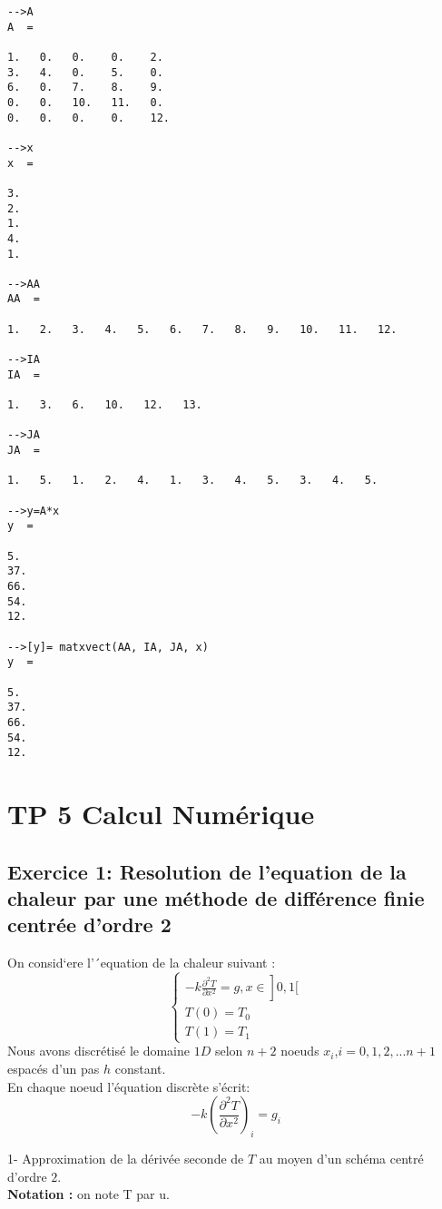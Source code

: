 \documentclass[12pt]{report}
\begin{document}
\begin{lstlisting}
-->A
A  = 

1.   0.   0.    0.    2. 
3.   4.   0.    5.    0. 
6.   0.   7.    8.    9. 
0.   0.   10.   11.   0. 
0.   0.   0.    0.    12.

-->x
x  = 

3.
2.
1.
4.
1.

-->AA
AA  = 

1.   2.   3.   4.   5.   6.   7.   8.   9.   10.   11.   12.

-->IA
IA  = 

1.   3.   6.   10.   12.   13.

-->JA
JA  = 

1.   5.   1.   2.   4.   1.   3.   4.   5.   3.   4.   5.

-->y=A*x
y  = 

5. 
37.
66.
54.
12.

-->[y]= matxvect(AA, IA, JA, x)
y  = 

5. 
37.
66.
54.
12.

\end{lstlisting}


\chapter{TP 5 Calcul Numérique}

\section{Exercice 1: Resolution de l’equation de la chaleur par une méthode de différence finie centrée d’ordre 2}
On consid`ere l’´equation de la chaleur suivant :
$$
\left\{\begin{array}{l}
\left.-k \frac{\partial^{2} T}{\partial x^{2}}=g, x \in\right] 0,1[ \\
T(0)=T_{0} \\
T(1)=T_{1}
\end{array}\right.
$$
Nous avons discrétisé le domaine $1D$ selon $n+ 2$ noeuds $x_{i}$,$ i = 0, 1, 2, ...n+ 1$ espacés d’un pas $h$ constant.\\

En chaque noeud l'équation discrète s'écrit:
$$
-k\left(\frac{\partial^{2} T}{\partial x^{2}}\right)_{i}=g_{i}
$$


1- Approximation de la dérivée seconde de $T$ au moyen d’un schéma centré d’ordre $2$.\\

\textbf{Notation :} on note T par u.\\
\end{document}
